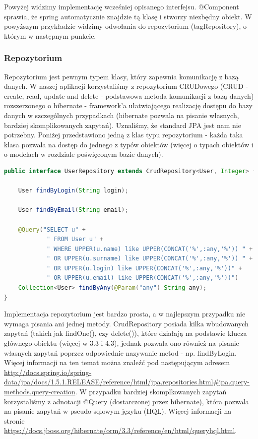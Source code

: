 \documentclass{report}
\begin{document}
Powyżej widzimy implementację wcześniej opisanego interfejsu. @Component sprawia, że spring automatycznie znajdzie tą klasę i stworzy niezbędny obiekt. W powyższym przykładzie widzimy odwołania do repozytorium (tagRepository), o którym w następnym punkcie.

			\subsubsection{Repozytorium}
			
			
Repozytorium jest pewnym typem klasy, który zapewnia komunikację z bazą danych. W naszej aplikacji korzystaliśmy z repozytorium CRUDowego (CRUD - create, read, update and delete - podstawowa metoda komunikacji z bazą danych) rozszerzonego o hibernate - framework'a ułatwiającego realizację dostępu do bazy danych w szczególnych przypadkach (hibernate pozwala na pisanie własnych, bardziej skomplikowanych zapytań). Uznaliśmy, że standard JPA jest nam nie potrzebny. Poniżej przedstawiono jedną z klas typu repozytorium - każda taka klasa pozwala na dostęp do jednego z typów obiektów (więcej o typach obiektów i o modelach w rozdziale poświęconym bazie danych).

\begin{lstlisting}[language=Java, breaklines]
public interface UserRepository extends CrudRepository<User, Integer> {

    User findByLogin(String login);

    User findByEmail(String email);

    @Query("SELECT u" +
            " FROM User u" +
            " WHERE UPPER(u.name) like UPPER(CONCAT('%',:any,'%')) " +
            " OR UPPER(u.surname) like UPPER(CONCAT('%',:any,'%')) " +
            " OR UPPER(u.login) like UPPER(CONCAT('%',:any,'%'))" +
            " OR UPPER(u.email) like UPPER(CONCAT('%',:any,'%'))")
    Collection<User> findByAny(@Param("any") String any);
}
\end{lstlisting}

Implementacja repozytorium jest bardzo prosta, a w najlepszym przypadku nie wymaga pisania ani jednej metody. CrudRepository posiada kilka wbudowanych zapytań (takich jak findOne(), czy delete()), które działają na podstawie klucza głównego obiektu (więcej w 3.3 i 4.3), jednak pozwala ono również na pisanie własnych zapytań poprzez odpowiednie nazywanie metod - np. findByLogin. Więcej informacji na ten temat można znaleźć pod następującym adresem \url{http://docs.spring.io/spring-data/jpa/docs/1.5.1.RELEASE/reference/html/jpa.repositories.html#jpa.query-methods.query-creation}. W przypadku bardziej skomplkowanych zapytań korzystaliśmy z adnotacji @Query (dostarczonej przez hibernate), która pozwala na pisanie zapytań w pseudo-sqlowym języku (HQL). Więcej informacji na stronie \url{https://docs.jboss.org/hibernate/orm/3.3/reference/en/html/queryhql.html}.
			
\end{document}
